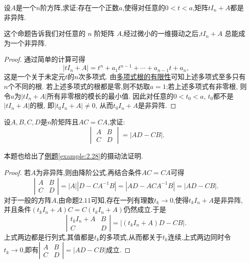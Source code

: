\documentclass[lang=cn,newtx,10pt,scheme=chinese]{elegantbook}
\begin{document}
\begin{proposition}\label{proposition:摄动法基本命题}
设\(A\)是一个\(n\)阶方阵,求证:存在一个正数\(a\),使得对任意的\(0 < t < a\),矩阵\(tI_n+A\)都是非异阵. 
\end{proposition}
\begin{note}
这个命题告诉我们对任意的 \(n\) 阶矩阵 \(A\),经过微小的一维摄动之后,\(tI_n + A\) 总能成为一个非异阵.
\end{note}
\begin{proof}
通过简单的计算可得
\[
|tI_n + A| = t^n + a_1t^{n - 1}+\cdots+a_{n - 1}t + a_n,
\]
这是一个关于未定元\(t\)的\(n\)次多项式. 由\hyperref[proposition:多项式根的有限性]{多项式根的有限性}可知上述多项式至多只有\(n\)个不同的根. 若上述多项式的根都是零,则不妨取\(a = 1\);若上述多项式有非零根, 则令\(a\)为\(|tI_n + A|\)所有非零根的模长的最小值. 因此对任意的\(0 < t_0 < a\), \(t_0\)都不是\(|tI_n + A|\)的根, 即\(|t_0I_n + A|\neq0\), 从而\(t_0I_n + A\)是非异阵.
\end{proof}

\begin{example}
设\(A,B,C,D\)是\(n\)阶矩阵且\(AC = CA\),求证:
\[
\begin{vmatrix}
A & B\\
C & D
\end{vmatrix}=|AD - CB|.
\]
\end{example}
\begin{note}
本题也给出了\hyperref[example:2.28]{例题\ref{example:2.28}}的摄动法证明.
\end{note}
\begin{proof}
若\(A\)为非异阵,则由降阶公式,再结合条件\(AC = CA\)可得
\[
\left|\begin{matrix}
A & B\\
C & D
\end{matrix}\right| = |A|\left|D - CA^{-1}B\right| = \left|AD - ACA^{-1}B\right| = |AD - CB|.
\]
对于一般的方阵\(A\),由命题\(2.11\)可知,存在一列有理数\(t_k\rightarrow 0\),使得\(t_kI_n + A\)是非异阵,并且条件\((t_kI_n + A)C = C(t_kI_n + A)\)仍然成立.于是
\[
\left|\begin{matrix}
t_kI_n + A & B\\
C & D
\end{matrix}\right| = \left|(t_kI_n + A)D - CB\right|.
\]
上式两边都是行列式,其值都是\(t_k\)的多项式,从而都关于\(t_k\)连续.上式两边同时令\(t_k\rightarrow 0\),即有\(\left|\begin{matrix}
A & B\\
C & D
\end{matrix}\right| = |AD - CB|\)成立.
\end{proof}
\end{document}
